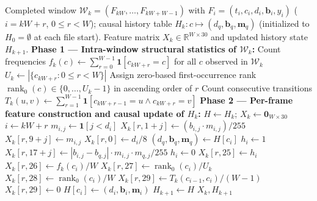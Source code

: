 \documentclass[12pt, a4paper, reqno, oneside]{book}
\begin{document}
\begin{algorithm}[htbp]
\caption{Causal window-level 30-dimensional structural feature extraction $\Phi(\mathcal{W}_k; H_k)$}\label{alg:causal-30d}
{\small\linespread{1.05}\selectfont
\begin{algorithmic}[1]
\Require Completed window $\mathcal{W}_k = (F_{kW}, \ldots, F_{kW+W-1})$ with $F_i = (t_i, c_i, d_i, \mathbf{b}_i, y_i)$ ($i = kW+r$, $0 \le r < W$); causal history table $H_k : c \mapsto (d_q, \mathbf{b}_q, \mathbf{m}_q)$ (initialized to $H_0 = \emptyset$ at each file start).
\Ensure Feature matrix $X_k \in \mathbb{R}^{W \times 30}$ and updated history state $H_{k+1}$.
\State \textbf{Phase 1 --- Intra-window structural statistics of $\mathcal{W}_k$:}
\State Count frequencies $f_k(c) \leftarrow \sum_{r=0}^{W-1} \mathbf{1}[c_{kW+r} = c]$ for all $c$ observed in $\mathcal{W}_k$
\State $U_k \leftarrow |\{c_{kW+r} : 0 \le r < W\}|$ 
\State Assign zero-based first-occurrence rank $\operatorname{rank}_0(c) \in \{0, \ldots, U_k - 1\}$ in ascending order of $r$
\State Count consecutive transitions $T_k(u, v) \leftarrow \sum_{r=1}^{W-1} \mathbf{1}[c_{kW+r-1} = u \land c_{kW+r} = v]$
\State \textbf{Phase 2 --- Per-frame feature construction and causal update of $H_k$:}
\State $H \leftarrow H_k$; \quad $X_k \leftarrow \mathbf{0}_{W \times 30}$
    \State $i \leftarrow kW + r$ 
        \State $m_{i,j} \leftarrow \mathbf{1}[j < d_i]$ 
        \State $X_k[r, 1 + j] \leftarrow (b_{i,j} \cdot m_{i,j}) / 255$ 
        \State $X_k[r, 9 + j] \leftarrow m_{i,j}$
    \EndFor
    \State $X_k[r, 0] \leftarrow d_i / 8$ 
     
        \State $(d_q, \mathbf{b}_q, \mathbf{m}_q) \leftarrow H[c_i]$
        \State $h_i \leftarrow 1$
            \State $X_k[r, 17 + j] \leftarrow |b_{i,j} - b_{q,j}| \cdot m_{i,j} \cdot m_{q,j} / 255$ 
        \EndFor
    \Else
        \State $h_i \leftarrow 0$ 
    \EndIf
    \State $X_k[r, 25] \leftarrow h_i$ 
    \State $X_k[r, 26] \leftarrow f_k(c_i) / W$ 
    \State $X_k[r, 27] \leftarrow \operatorname{rank}_0(c_i) / U_k$ 
    \State $X_k[r, 28] \leftarrow \operatorname{rank}_0(c_i) / W$ 
        \State $X_k[r, 29] \leftarrow T_k(c_{i-1}, c_i) / (W - 1)$ 
    \Else
        \State $X_k[r, 29] \leftarrow 0$ 
    \EndIf
    \State $H[c_i] \leftarrow (d_i, \mathbf{b}_i, \mathbf{m}_i)$ 
\EndFor
\State $H_{k+1} \leftarrow H$
\State \Return $X_k, H_{k+1}$
\end{algorithmic}}
\end{algorithm}
\end{document}
